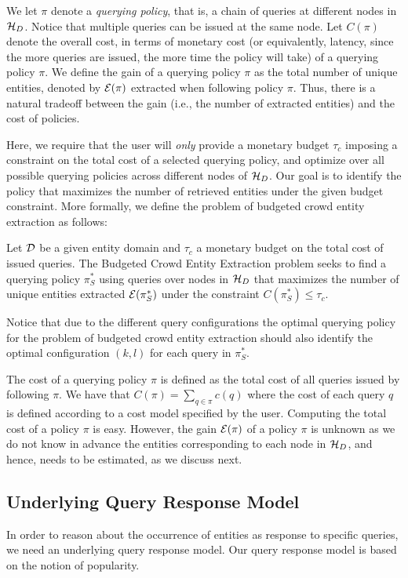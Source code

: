 We let $\pi$ denote a {\em querying policy}, that is, a chain of queries at different nodes in $\mathcal{H}_D$. Notice that multiple queries can be issued at the same node. Let $C(\pi)$ denote the overall cost, in terms of monetary cost (or equivalently, latency, since the more queries are issued, the more time the policy will take) of a querying policy $\pi$. We define the gain of a querying policy $\pi$ as the total number of unique entities, denoted by $\mathcal{E}(\pi)$ extracted when following policy $\pi$. Thus, there is a natural tradeoff between the gain (i.e., the number of extracted entities) and the cost of policies. 

Here, we require that the user will {\em only} provide a monetary budget $\tau_c$ imposing a constraint on the total cost of a selected querying policy, and optimize over all possible querying policies across different nodes of $\mathcal{H}_D$. Our goal is to identify the policy that maximizes the number of retrieved entities under the given budget constraint. More formally, we define the problem of budgeted crowd entity extraction as follows:

\begin{problem}
Let $\mathcal{D}$ be a given entity domain and $\tau_c$ a monetary budget on the total cost of issued queries. The Budgeted Crowd Entity Extraction problem seeks to find a querying policy $\pi^*_S$ using queries over nodes in $\mathcal{H}_D$ that maximizes the number of unique entities extracted $\mathcal{E}(\pi^*_S)$ under the constraint $C(\pi^*_S) \leq \tau_c$.
\end{problem}
Notice that due to the different query configurations the optimal querying policy for the problem of budgeted crowd entity extraction should also identify the optimal configuration $(k,l)$ for each query in $\pi^*_S$.

The cost of a querying policy $\pi$ is defined as the total cost of all queries issued by following $\pi$. We have that $C(\pi) = \sum_{q \in \pi} c(q)$ where the cost of each query $q$ is defined according to a cost model specified by the user. Computing the total cost of a policy $\pi$ is easy. However, the gain $\mathcal{E}(\pi)$ of a policy $\pi$ is unknown as we do not know in advance the entities corresponding to each node in $\mathcal{H}_D$, and hence, needs to be estimated, as we discuss next. 

\subsection{Underlying Query Response Model}
\label{sec:sampling}
In order to reason about the occurrence of entities as response to specific queries, we need an underlying query response model. Our query response model is based on the notion of popularity.

